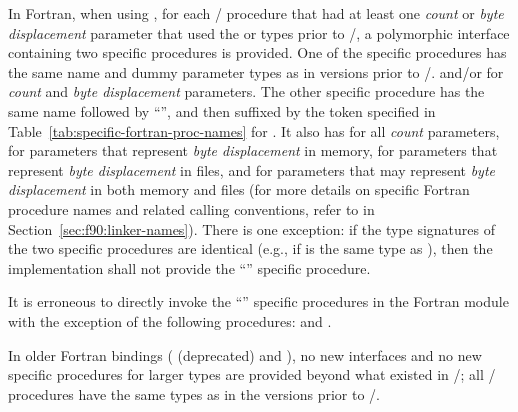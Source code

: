 In Fortran, when using ,
for each \MPI/ procedure that had at least one
\emph{count} or \emph{byte displacement} parameter
that used the  or  types prior to \MPIIVDOTO/,
a polymorphic interface containing two specific procedures is provided.
One of the specific procedures has
the same name and dummy parameter types as in versions prior to \MPIIVDOTO/.
 and/or  for \emph{count} and \emph{byte displacement} parameters.
The other specific procedure has the same name
followed by ``'', and then
suffixed by the token specified in Table~\ref{tab:specific-fortran-proc-names} for .
It also has
 for all \emph{count} parameters,
 for parameters that represent \emph{byte displacement} in memory,
 for parameters that represent \emph{byte displacement} in files,
and
 for parameters that may represent \emph{byte displacement} in both memory and files
(for more details on specific Fortran
procedure names and related calling conventions, refer to
 in
Section~\ref{sec:f90:linker-names}).
%
There is one exception: if the type signatures of the two
specific procedures are identical (e.g., if
 is the same type as
), then the implementation
shall not provide the ``'' specific procedure.

It is erroneous to directly invoke the ``'' specific procedures in
the Fortran  module with the exception of the following procedures:  and .

In older Fortran bindings ( (deprecated) and ),
no new interfaces and no new specific procedures for larger types are provided beyond what existed in \MPIIIIDOTI/;
all \MPI/ procedures have the same types as in the versions prior to \MPIIVDOTO/.
%


